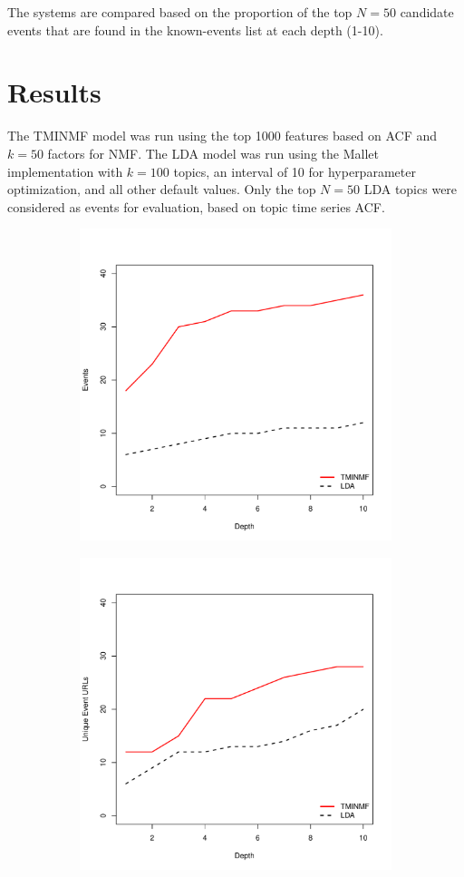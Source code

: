 \documentclass{sig-alternate}
\begin{document}
The systems are compared based on the proportion of the top $N=50$ candidate events that are found in the known-events list at each depth (1-10).

\section{Results}
The TMINMF model was run using the top 1000 features based on ACF and $k=50$ factors for NMF. The LDA model was run using the Mallet implementation with $k=100$ topics, an interval of 10 for hyperparameter optimization, and all other default values. Only the top $N=50$ LDA topics were considered as events for evaluation, based on topic time series ACF.


\begin{figure}[!ht]
\centering
\begin{subfigure}{.5\textwidth}
  \centering
\includegraphics[width=10cm]{plots/events_at_depth.pdf}
\end{subfigure}%
\begin{subfigure}{.5\textwidth}
  \centering
\includegraphics[width=10cm]{plots/unique_urls_at_depth.pdf}

\end{subfigure}
\end{figure}
\end{document}
